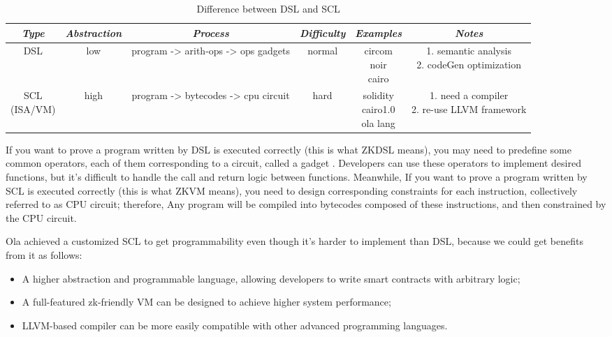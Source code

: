 \begin{table}[!ht]
    \centering
    \begin{tabular}{|c|c|c|c|c|c|}
        \hline
        \emph{Type} & \emph{Abstraction} & \emph{Process} & \emph{Difficulty} & \emph{Examples} & \emph{Notes} \\ 
        \hline
        DSL & low & program -> arith-ops -> ops gadgets & normal & \makecell{circom \\ noir \\ cairo} & \makecell{1. semantic analysis \\ 2. codeGen optimization} \\
        \hline
        \makecell{SCL \\ (ISA/VM)} & high & program -> bytecodes -> cpu circuit & hard & \makecell{solidity \\ cairo1.0 \\ ola lang} & \makecell{1. need a compiler \\2. re-use LLVM framework} \\
        \hline
    \end{tabular}
    \caption{Difference between DSL and SCL}
    \label{table:Difference between DSL and SCL}
\end{table}

If you want to prove a program written by DSL is executed correctly (this is what ZKDSL means), you may need to predefine some common operators, each of them corresponding to a circuit, called a gadget \cite{website:Gadget}. 
Developers can use these operators to implement desired functions, but it's difficult to handle the call and return logic between functions. Meanwhile, If you want to prove a program written by SCL is executed correctly (this is what ZKVM means), 
 you need to design corresponding constraints for each instruction, collectively referred to as CPU circuit; therefore, Any program will be compiled into 
 bytecodes composed of these instructions, and then constrained by the CPU circuit.

Ola achieved a customized SCL to get programmability even though it's harder to implement than DSL, because we could get benefits from it as follows:
 \begin{itemize}
 \item A higher abstraction and programmable language, allowing developers to write smart contracts with arbitrary logic;
 \item A full-featured zk-friendly VM can be designed to achieve higher system performance;
 \item LLVM-based compiler can be more easily compatible with other advanced programming languages.
\end{itemize}
